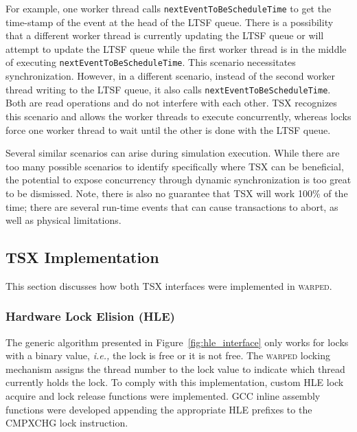 \documentclass{sig-alternate}
\begin{document}
For example, one worker thread calls \texttt{nextEventToBeScheduleTime} to get
the time-stamp of the event at the head of the LTSF queue.  There is a
possibility that a different worker thread is currently updating the LTSF queue
or will attempt to update the LTSF queue while the first worker thread is in
the middle of executing \texttt{nextEventToBeScheduleTime}.  This scenario
necessitates synchronization.  However, in a different scenario, instead of the
second worker thread writing to the LTSF queue, it also calls
\texttt{nextEventToBeScheduleTime}.  Both are read operations and do not
interfere with each other.  TSX recognizes this scenario and allows the worker
threads to execute concurrently, whereas locks force one worker thread to wait
until the other is done with the LTSF queue.

Several similar scenarios can arise during simulation execution.  While there are too many
possible scenarios to identify specifically where TSX can be beneficial, the potential to
expose concurrency through dynamic synchronization is too great to be dismissed.  Note,
there is also no guarantee that TSX will work 100\% of the time; there are several
run-time events that can cause transactions to abort, as well as physical limitations.

\subsection{TSX Implementation}

This section discusses how both TSX interfaces were implemented in \textsc{warped}.

\subsubsection{Hardware Lock Elision (HLE)}

The generic algorithm presented in Figure~\ref{fig:hle_interface} only works for locks
with a binary value, \emph{i.e.,} the lock is free or it is not free.  The \textsc{warped}
locking mechanism assigns the thread number to the lock value to indicate which thread
currently holds the lock.  To comply with this implementation, custom HLE lock acquire and
lock release functions were implemented.  GCC inline assembly functions were developed
appending the appropriate HLE prefixes to the CMPXCHG lock instruction.
\end{document}
